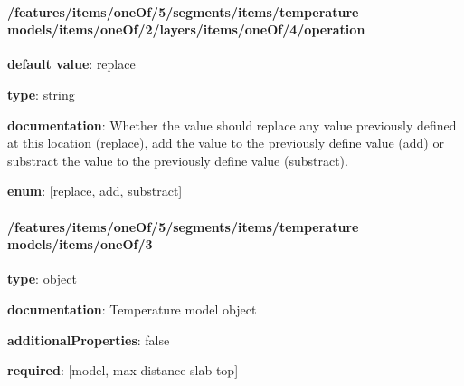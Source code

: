 \begin{itemized}
\end{itemized}\paragraph{/features/items/oneOf/5/segments/items/temperature models/items/oneOf/2/layers/items/oneOf/4/operation} \begin{itemized}
\item {\bf default value}: replace
\item {\bf type}: string
\item {\bf documentation}: Whether the value should replace any value previously defined at this location (replace), add the value to the previously define value (add) or substract the value to the previously define value (substract).
\item {\bf enum}: [replace, add, substract]\end{itemized}\paragraph{/features/items/oneOf/5/segments/items/temperature models/items/oneOf/3} \begin{itemized}
\item {\bf type}: object
\item {\bf documentation}: Temperature model object
\item {\bf additionalProperties}: false
\item {\bf required}: [model, max distance slab top]\end{itemized}
